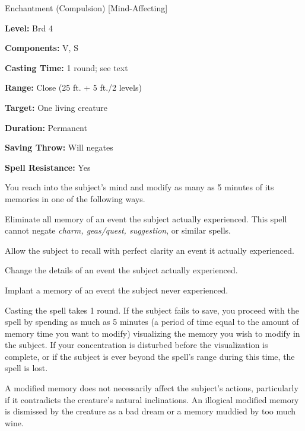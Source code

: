 
Enchantment (Compulsion) [Mind-Affecting]

\textbf{Level:} Brd 4

\textbf{Components:} V, S

\textbf{Casting Time:} 1 round; see text

\textbf{Range:} Close (25 ft. + 5 ft./2 levels)

\textbf{Target:} One living creature

\textbf{Duration:} Permanent

\textbf{Saving Throw:} Will negates

\textbf{Spell Resistance:} Yes

You reach into the subject's mind and modify as many as 5 minutes of its memories 
in one of the following ways.%

Eliminate all memory of an event the subject actually experienced. This spell cannot 
negate \textit{charm, geas/quest, suggestion}, or similar spells.%

Allow the subject to recall with perfect clarity an event it actually experienced.%

Change the details of an event the subject actually experienced.%

Implant a memory of an event the subject never experienced.

Casting the spell takes 1 round. If the subject fails to save, you proceed with 
the spell by spending as much as 5 minutes (a period of time equal to the amount 
of memory time you want to modify) visualizing the memory you wish to modify in 
the subject. If your concentration is disturbed before the visualization is complete, 
or if the subject is ever beyond the spell's range during this time, the spell 
is lost.

A modified memory does not necessarily affect the subject's actions, particularly 
if it contradicts the creature's natural inclinations. An illogical modified memory 
is dismissed by the creature as a bad dream or a memory muddied by too much wine. 

